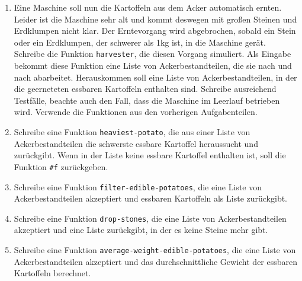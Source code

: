 \begin{aufgabe}
\begin{enumerate}
  \item Eine Maschine soll nun die Kartoffeln aus dem
    Acker automatisch ernten.  Leider ist die Maschine sehr alt und
    kommt deswegen mit großen Steinen und Erdklumpen nicht klar.  Der
    Erntevorgang wird abgebrochen, sobald ein Stein oder ein
    Erdklumpen, der schwerer als 1kg ist, in die Maschine gerät.
    Schreibe die Funktion \texttt{harvester}, die diesen Vorgang
    simuliert. Als Eingabe bekommt diese Funktion eine Liste von
    Ackerbestandteilen, die sie nach und nach abarbeitet.
    Herauskommen soll eine Liste von Ackerbestandteilen, in der die
    geerneteten essbaren Kartoffeln enthalten sind.  Schreibe
    ausreichend Testfälle, beachte auch den Fall, dass die
    Maschine im Leerlauf betrieben wird.  Verwende die Funktionen
    aus den vorherigen Aufgabenteilen.

  \item Schreibe eine Funktion
    \texttt{heaviest-potato}, die aus einer Liste von
    Ackerbestandteilen die schwerste essbare Kartoffel heraussucht und
    zurückgibt.  Wenn in der Liste keine essbare Kartoffel enthalten ist, soll
    die Funktion \verb|#f| zurückgeben.

    \item Schreibe eine Funktion
      \texttt{filter-edible-potatoes}, die eine Liste von
      Ackerbestandteilen akzeptiert und essbaren Kartoffeln als Liste
      zurückgibt.

    \item Schreibe eine Funktion
      \texttt{drop-stones}, die eine Liste von Ackerbestandteilen
      akzeptiert und eine Liste zurückgibt, in der es keine Steine mehr
      gibt.

    \item Schreibe eine Funktion
      \texttt{average-weight-edible-potatoes}, die eine Liste von
      Ackerbestandteilen akzeptiert und das durchschnittliche Gewicht
      der essbaren Kartoffeln berechnet.

  \end{enumerate}
  
\end{aufgabe}

